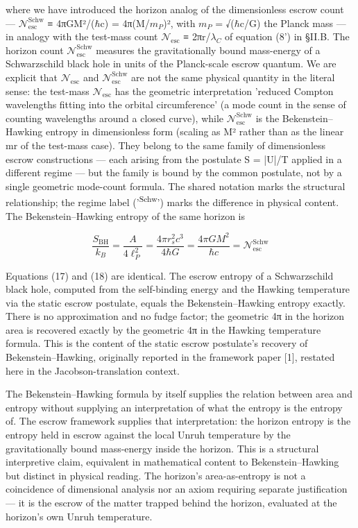 \documentclass[11pt]{article}
\begin{document}
where we have introduced the horizon analog of the dimensionless escrow
count --- $\mathcal{N}_{\mathrm{esc}}^{\mathrm{Schw}}$ ≡ 4πGM²/($\hbar$c) = 4π(M/$m_{P}$)², with $m_{P}$ = √($\hbar$c/G) the
Planck mass --- in analogy with the test-mass count $\mathcal{N}_{\mathrm{esc}}$ ≡ 2πr/$\lambda_{C}$ of
equation (8') in §II.B. The horizon count $\mathcal{N}_{\mathrm{esc}}^{\mathrm{Schw}}$ measures the
gravitationally bound mass-energy of a Schwarzschild black hole in units
of the Planck-scale escrow quantum. We are explicit that $\mathcal{N}_{\mathrm{esc}}$ and
$\mathcal{N}_{\mathrm{esc}}^{\mathrm{Schw}}$ are not the same physical quantity in the literal sense: the
test-mass $\mathcal{N}_{\mathrm{esc}}$ has the geometric interpretation 'reduced Compton
wavelengths fitting into the orbital circumference' (a mode count in
the sense of counting wavelengths around a closed curve), while
$\mathcal{N}_{\mathrm{esc}}^{\mathrm{Schw}}$ is the Bekenstein--Hawking entropy in dimensionless form
(scaling as M² rather than as the linear mr of the test-mass case). They
belong to the same family of dimensionless escrow constructions --- each
arising from the postulate S = |U|/T applied in a different regime ---
but the family is bound by the common postulate, not by a single
geometric mode-count formula. The shared notation marks the structural
relationship; the regime label ('\textsuperscript{Schw}') marks the difference in
physical content. The Bekenstein--Hawking entropy of the same horizon is

\begin{equation}
  \frac{S_{\mathrm{BH}}}{k_{B}} = \frac{A}{4\ell_{P}^{2}} = \frac{4\pi r_{s}^{2} c^{3}}{4\hbar G} = \frac{4\pi G M^{2}}{\hbar c} = \mathcal{N}_{\mathrm{esc}}^{\mathrm{Schw}}
  \label{eq:18}
\end{equation}

Equations (17) and (18) are identical. The escrow entropy of a
Schwarzschild black hole, computed from the self-binding energy and the
Hawking temperature via the static escrow postulate, equals the
Bekenstein--Hawking entropy exactly. There is no approximation and no
fudge factor; the geometric 4π in the horizon area is recovered exactly
by the geometric 4π in the Hawking temperature formula. This is the
content of the static escrow postulate's recovery of
Bekenstein--Hawking, originally reported in the framework paper [1],
restated here in the Jacobson-translation context.

The Bekenstein--Hawking formula by itself supplies the relation between
area and entropy without supplying an interpretation of what the entropy
is the entropy of. The escrow framework supplies that interpretation:
the horizon entropy is the entropy held in escrow against the local
Unruh temperature by the gravitationally bound mass-energy inside the
horizon. This is a structural interpretive claim, equivalent in
mathematical content to Bekenstein--Hawking but distinct in physical
reading. The horizon's area-as-entropy is not a coincidence of
dimensional analysis nor an axiom requiring separate justification ---
it is the escrow of the matter trapped behind the horizon, evaluated at
the horizon's own Unruh temperature.
\end{document}
